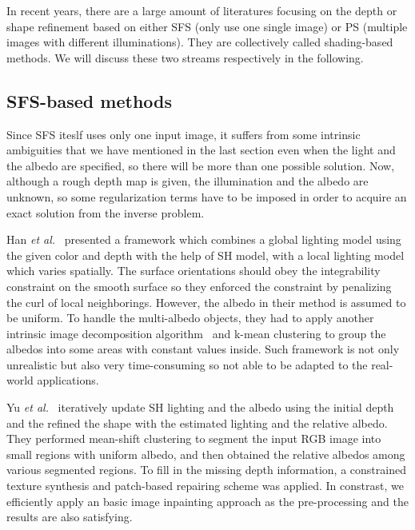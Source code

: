 In recent years, there are a large amount of literatures focusing on the depth or shape refinement based on either SFS (only use one single image) or PS (multiple images with different illuminations).
They are collectively called shading-based methods.
We will discuss these two streams respectively in the following.
\subsection{SFS-based methods}
Since SFS iteslf uses only one input image, it suffers from some intrinsic ambiguities that we have mentioned in the last section even when the light and the albedo are specified, so there will be more than one possible solution.
Now, although a rough depth map is given, the illumination and the albedo are unknown, so some regularization terms have to be imposed in order to acquire an exact solution from the inverse problem.

Han \emph{et al.}~\cite{han2013high} presented a framework which combines a global lighting model using the given color and depth with the help of SH model, with a local lighting model which varies spatially. 
The surface orientations should obey the integrability constraint on the smooth surface so they enforced the constraint by penalizing the curl of local neighborings.
However, the albedo in their method is assumed to be uniform.
To handle the multi-albedo objects, they had to apply another intrinsic image decomposition algorithm~\cite{barron2011high} and k-mean clustering to group the albedos into some areas with constant values inside.
Such framework is not only unrealistic but also very time-consuming so not able to be adapted to the real-world applications.

Yu \emph{et al.}~\cite{yu2013shading} iteratively update SH lighting and the albedo using the initial depth and the refined the shape with the estimated lighting and the relative albedo. 
They performed mean-shift clustering to segment the input RGB image into small regions with uniform albedo, and then obtained the relative albedos among various segmented regions. 
To fill in the missing depth information, a constrained texture synthesis and patch-based repairing scheme was applied.
In constrast, we efficiently apply an basic image inpainting approach as the pre-processing and the results are also satisfying.


